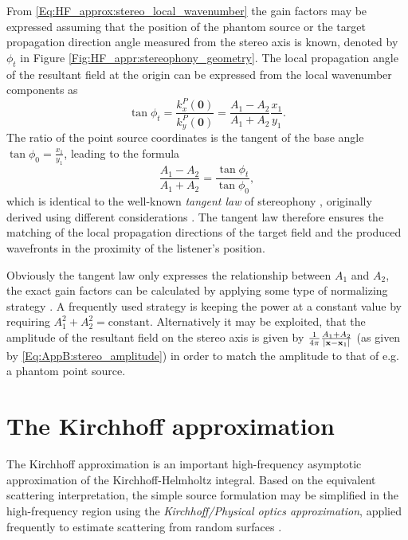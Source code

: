 From \eqref{Eq:HF_approx:stereo_local_wavenumber} the gain factors may be expressed assuming that the position of the phantom source or the target propagation direction angle measured from the stereo axis is known, denoted by $\phi_t$ in Figure \eqref{Fig:HF_appr:stereophony_geometry}.
The local propagation angle of the resultant field at the origin can be expressed from the local wavenumber components as
\begin{equation}
\tan \phi_t = \frac{k_x^P(\mathbf{0})}{k_y^P(\mathbf{0})} = \frac{A_1-A_2}{A_1+A_2}\frac{x_1}{y_1}.
\end{equation}
The ratio of the point source coordinates is the tangent of the base angle $\tan \phi_0 = \frac{x_1}{y_1}$, leading to the formula
\begin{equation}
\frac{A_1 - A_2}{A_1 + A_2} = \frac{\tan \phi_t}{\tan \phi_0},
\end{equation}
which is identical to the well-known \emph{tangent law} of stereophony \cite{Pulkki1997, Pulkki2001:phd, SpringerHandbookSpeech2008, Pulkki2001a}, originally derived using different considerations \cite{Bennett1985}.
The tangent law therefore ensures the matching of the local propagation directions of the target field and the produced wavefronts in the proximity of the listener's position.

Obviously the tangent law only expresses the relationship between $A_1$ and $A_2$, the exact gain factors can be calculated by applying some type of normalizing strategy \cite{Moore1990}.
A frequently used strategy is keeping the power at a constant value by requiring $A_1^2 + A_2^2 = \text{constant}$.
Alternatively it may be exploited, that the amplitude of the resultant field on the stereo axis is given by $\frac{1}{4\pi}\frac{A_1+A_2}{|\mathbf{x}-\mathbf{x}_1|}$ (as given by \eqref{Eq:AppB:stereo_amplitude}) in order to match the amplitude to that of e.g. a phantom point source.

\newpage
\section{The Kirchhoff approximation}

The Kirchhoff  approximation is an important high-frequency asymptotic approximation of the Kirchhoff-Helmholtz integral.
Based on the equivalent scattering interpretation, the simple source formulation may be simplified in the high-frequency region using the \emph{Kirchhoff/Physical optics approximation}, applied frequently to estimate scattering from random surfaces \cite{Voronich1999, Tsang2000}.

